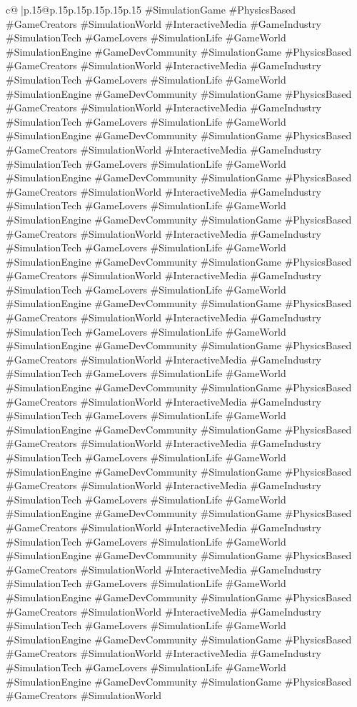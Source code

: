 \documentclass{article}
\begin{document}
{\begin{supertabular}{c@{$\;$}|p{.15\linewidth}@{}p{.15\linewidth}p{.15\linewidth}p{.15\linewidth}p{.15\linewidth}p{.15\linewidth}}
{{{\#SimulationGame \#PhysicsBased \#GameCreators \#SimulationWorld \#InteractiveMedia \#GameIndustry \#SimulationTech \#GameLovers \#SimulationLife \#GameWorld \#SimulationEngine \#GameDevCommunity \#SimulationGame \#PhysicsBased \#GameCreators \#SimulationWorld \#InteractiveMedia \#GameIndustry \#SimulationTech \#GameLovers \#SimulationLife \#GameWorld \#SimulationEngine \#GameDevCommunity \#SimulationGame \#PhysicsBased \#GameCreators \#SimulationWorld \#InteractiveMedia \#GameIndustry \#SimulationTech \#GameLovers \#SimulationLife \#GameWorld \#SimulationEngine \#GameDevCommunity \#SimulationGame \#PhysicsBased \#GameCreators \#SimulationWorld \#InteractiveMedia \#GameIndustry \#SimulationTech \#GameLovers \#SimulationLife \#GameWorld \#SimulationEngine \#GameDevCommunity \#SimulationGame \#PhysicsBased \#GameCreators \#SimulationWorld \#InteractiveMedia \#GameIndustry \#SimulationTech \#GameLovers \#SimulationLife \#GameWorld \#SimulationEngine \#GameDevCommunity \#SimulationGame \#PhysicsBased \#GameCreators \#SimulationWorld \#InteractiveMedia \#GameIndustry \#SimulationTech \#GameLovers \#SimulationLife \#GameWorld \#SimulationEngine \#GameDevCommunity \#SimulationGame \#PhysicsBased \#GameCreators \#SimulationWorld \#InteractiveMedia \#GameIndustry \#SimulationTech \#GameLovers \#SimulationLife \#GameWorld \#SimulationEngine \#GameDevCommunity \#SimulationGame \#PhysicsBased \#GameCreators \#SimulationWorld \#InteractiveMedia \#GameIndustry \#SimulationTech \#GameLovers \#SimulationLife \#GameWorld \#SimulationEngine \#GameDevCommunity \#SimulationGame \#PhysicsBased \#GameCreators \#SimulationWorld \#InteractiveMedia \#GameIndustry \#SimulationTech \#GameLovers \#SimulationLife \#GameWorld \#SimulationEngine \#GameDevCommunity \#SimulationGame \#PhysicsBased \#GameCreators \#SimulationWorld \#InteractiveMedia \#GameIndustry \#SimulationTech \#GameLovers \#SimulationLife \#GameWorld \#SimulationEngine \#GameDevCommunity \#SimulationGame \#PhysicsBased \#GameCreators \#SimulationWorld \#InteractiveMedia \#GameIndustry \#SimulationTech \#GameLovers \#SimulationLife \#GameWorld \#SimulationEngine \#GameDevCommunity \#SimulationGame \#PhysicsBased \#GameCreators \#SimulationWorld \#InteractiveMedia \#GameIndustry \#SimulationTech \#GameLovers \#SimulationLife \#GameWorld \#SimulationEngine \#GameDevCommunity \#SimulationGame \#PhysicsBased \#GameCreators \#SimulationWorld \#InteractiveMedia \#GameIndustry \#SimulationTech \#GameLovers \#SimulationLife \#GameWorld \#SimulationEngine \#GameDevCommunity \#SimulationGame \#PhysicsBased \#GameCreators \#SimulationWorld \#InteractiveMedia \#GameIndustry \#SimulationTech \#GameLovers \#SimulationLife \#GameWorld \#SimulationEngine \#GameDevCommunity \#SimulationGame \#PhysicsBased \#GameCreators \#SimulationWorld \#InteractiveMedia \#GameIndustry \#SimulationTech \#GameLovers \#SimulationLife \#GameWorld \#SimulationEngine \#GameDevCommunity \#SimulationGame \#PhysicsBased \#GameCreators \#SimulationWorld \#InteractiveMedia \#GameIndustry \#SimulationTech \#GameLovers \#SimulationLife \#GameWorld \#SimulationEngine \#GameDevCommunity \#SimulationGame \#PhysicsBased \#GameCreators \#SimulationWorld }}}
\end{supertabular}}
\end{document}
